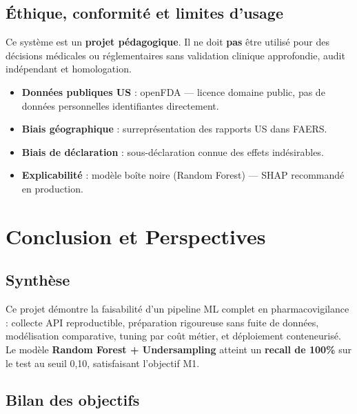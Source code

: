 \documentclass[11pt,a4paper,twoside,openright]{report}
\begin{document}
\section{Éthique, conformité et limites d'usage}

\begin{warningbox}
Ce système est un \textbf{projet pédagogique}. Il ne doit \textbf{pas} être utilisé pour des décisions médicales ou réglementaires sans validation clinique approfondie, audit indépendant et homologation.
\end{warningbox}

\begin{itemize}
  \item \textbf{Données publiques US} : openFDA — licence domaine public, pas de données personnelles identifiantes directement.
  \item \textbf{Biais géographique} : surreprésentation des rapports US dans FAERS.
  \item \textbf{Biais de déclaration} : sous-déclaration connue des effets indésirables.
  \item \textbf{Explicabilité} : modèle boîte noire (Random Forest) — SHAP recommandé en production.
\end{itemize}

\chapter*{Conclusion et Perspectives}

\section*{Synthèse}

Ce projet démontre la faisabilité d'un pipeline ML complet en pharmacovigilance : collecte API reproductible, préparation rigoureuse sans fuite de données, modélisation comparative, tuning par coût métier, et déploiement conteneurisé. Le modèle \textbf{Random Forest + Undersampling} atteint un \textbf{recall de 100\%} sur le test au seuil 0,10, satisfaisant l'objectif M1.

\section*{Bilan des objectifs}
\end{document}
